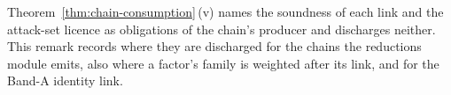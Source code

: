 
Theorem~\ref{thm:chain-consumption}\,(v) names the soundness of each link and the
attack-set licence as obligations of the chain's producer and discharges
neither. This remark records where they are discharged for the chains the
reductions module emits, also where a factor's family is weighted after its
link, and for the Band-A identity link.

